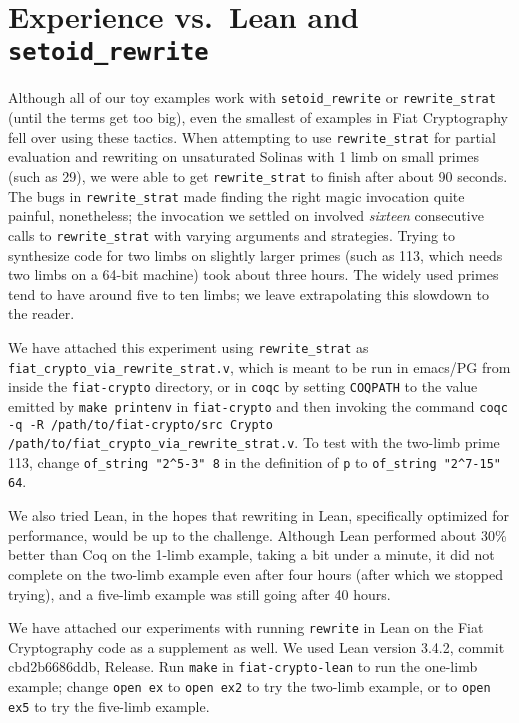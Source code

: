 \documentclass[sigplan,10pt,review,anonymous]{acmart}\settopmatter{printfolios=true,printccs=false,printacmref=false}
\begin{document}
\section{Experience vs.\ Lean and \texorpdfstring{\texttt{setoid\_rewrite}}{setoid\_rewrite}}

Although all of our toy examples work with \texttt{setoid\_rewrite} or \texttt{rewrite\_strat} (until the terms get too big), even the smallest of examples in Fiat Cryptography fell over using these tactics.
When attempting to use \texttt{rewrite\_strat} for partial evaluation and rewriting on unsaturated Solinas with 1 limb on small primes (such as 29), we were able to get \texttt{rewrite\_strat} to finish after about 90 seconds.
The bugs in \texttt{rewrite\_strat} made finding the right magic invocation quite painful, nonetheless; the invocation we settled on involved \emph{sixteen} consecutive calls to \texttt{rewrite\_strat} with varying arguments and strategies.
Trying to synthesize code for two limbs on slightly larger primes (such as 113, which needs two limbs on a 64-bit machine) took about three hours.
The widely used primes tend to have around five to ten limbs; we leave extrapolating this slowdown to the reader.

We have attached this experiment using \verb|rewrite_strat| as \verb|fiat_crypto_via_rewrite_strat.v|, which is meant to be run in emacs/PG from inside the \verb|fiat-crypto| directory, or in \verb|coqc| by setting \verb|COQPATH| to the value emitted by \texttt{make printenv} in \verb|fiat-crypto| and then invoking the command \texttt{coqc -q -R /path/to/fiat-crypto/src Crypto /path/to/fiat\_crypto\_via\_rewrite\_strat.v}.
To test with the two-limb prime 113, change \verb|of_string "2^5-3" 8| in the definition of \verb|p| to \verb|of_string "2^7-15" 64|.

We also tried Lean, in the hopes that rewriting in Lean, specifically optimized for performance, would be up to the challenge.
Although Lean performed about 30\% better than Coq on the 1-limb example, taking a bit under a minute, it did not complete on the two-limb example even after four hours (after which we stopped trying), and a five-limb example was still going after 40 hours.

We have attached our experiments with running \texttt{rewrite} in Lean on the Fiat Cryptography code as a supplement as well.
We used Lean version 3.4.2, commit cbd2b6686ddb, Release.
Run \texttt{make} in \texttt{fiat-crypto-lean} to run the one-limb example;
change \texttt{open ex} to \texttt{open ex2} to try the two-limb example, or to \texttt{open ex5} to try the five-limb example.
\end{document}

